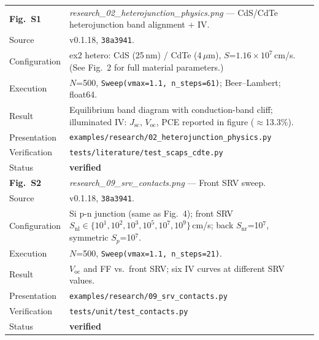 \documentclass[11pt,a4paper]{article}
\begin{document}
\begin{table}[tbp]
\begin{tabularx}{\linewidth}{@{}Z Y@{}}
\textbf{Fig.~S1} &
\textit{research\_02\_heterojunction\_physics.png} ---
CdS/CdTe heterojunction band alignment + IV. \\
Source & v0.1.18, \texttt{38a3941}. \\
Configuration &
  ex2 hetero: CdS (25\,nm) / CdTe (4\,$\mu$m),
  $S$=$1.16{\times}10^7$\,cm/s.
  (See Fig.~2 for full material parameters.) \\
Execution &
  $N$=500, \texttt{Sweep(vmax=1.1, n\_steps=61)};
  Beer--Lambert; float64. \\
Result &
  Equilibrium band diagram with conduction-band cliff;
  illuminated IV: $J_\mathrm{sc}$, $V_\mathrm{oc}$, PCE reported
  in figure ($\approx$13.3\%). \\
Presentation &
  \texttt{examples/research/02\_heterojunction\_physics.py} \\
Verification &
  \texttt{tests/literature/test\_scaps\_cdte.py} \\
Status & \textcolor{green!50!black}{\textbf{verified}} \\[4pt]

\textbf{Fig.~S2} &
\textit{research\_09\_srv\_contacts.png} --- Front SRV sweep. \\
Source & v0.1.18, \texttt{38a3941}. \\
Configuration &
  Si p-n junction (same as Fig.~4); front SRV
  $S_\mathrm{nl}\in\{10^1,10^2,10^3,10^5,10^7,10^9\}$\,cm/s;
  back $S_\mathrm{nr}$=10$^7$, symmetric $S_p$=10$^7$. \\
Execution &
  $N$=500, \texttt{Sweep(vmax=1.1, n\_steps=21)}. \\
Result &
  $V_\mathrm{oc}$ and FF vs.\ front SRV; six IV curves at
  different SRV values. \\
Presentation &
  \texttt{examples/research/09\_srv\_contacts.py} \\
Verification &
  \texttt{tests/unit/test\_contacts.py} \\
Status & \textcolor{green!50!black}{\textbf{verified}} \\[4pt]


\end{tabularx}
\end{table}
\end{document}
